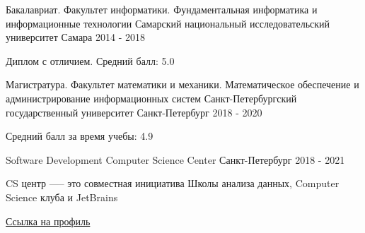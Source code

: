 

\begin{cventries}

\cventry
    {Бакалавриат. Факультет информатики. Фундаментальная информатика и информационные технологии} %
    {Самарский национальный исследовательский университет} %
    {Самара} %
    {2014 - 2018} %
    {
      \begin{cvitems} %
        \item {Диплом с отличием. Средний балл: 5.0}
      \end{cvitems}
    }
    \cventry
    {Магистратура. Факультет математики и механики. Математическое обеспечение и администрирование информационных систем} %
    {Санкт-Петербургский государственный университет} %
    {Санкт-Петербург} %
    {2018 - 2020} %
    {
      \begin{cvitems} %
        \item {Средний балл за время учебы: 4.9}
      \end{cvitems}
    }
        \cventry
    {Software Development} %
    {Computer Science Center} %
    {Санкт-Петербург} %
    {2018 - 2021} %
    {
      \begin{cvitems} %
      \item CS центр —-- это совместная инициатива Школы анализа данных, Computer Science клуба и JetBrains
        \item {\href{https://my.compscicenter.ru/users/4744/}{Ссылка на профиль}}
      \end{cvitems}
    }
    

\end{cventries}
